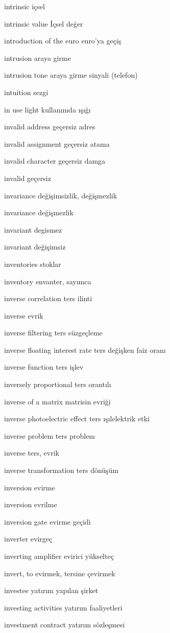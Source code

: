 \documentclass[12pt,fleqn]{article}\usepackage{../../common}
\begin{document}
intrinsic içsel 

intrinsic value İçsel değer

introduction of the euro euro'ya geçiş

intrusion araya girme

intrusion tone araya girme sinyali (telefon)

intuition sezgi

in use light kullanımda ışığı

invalid address geçersiz adres

invalid assignment geçersiz atama

invalid character geçersiz damga

invalid geçersiz

invariance değişimsizlik, değişmezlik

invariance değişmezlik

invariant degismez

invariant değişimsiz

inventories stoklar

inventory envanter, sayımca

inverse correlation ters ilinti

inverse evrik

inverse filtering ters süzgeçleme

inverse floating interest rate ters değişken faiz oranı

inverse function ters işlev

inversely proportional ters orantılı

inverse of a matrix matrisin evriği

inverse photoelectric effect ters ışılelektrik etki

inverse problem ters problem

inverse ters, evrik

inverse transformation ters dönüşüm

inversion evirme

inversion evrilme

inversion gate evirme geçidi

inverter evirgeç

inverting amplifier evirici yükselteç

invert, to evirmek, tersine çevirmek

investee yatırım yapılan şirket

investing activities yatırım faaliyetleri

investment contract yatırım sözleşmesi
\end{document}

